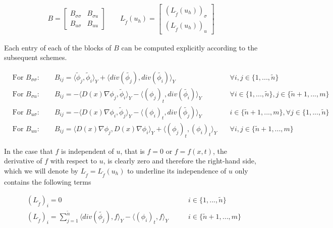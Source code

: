 \documentclass[../draft_1.tex]{subfiles}
\begin{document}
\begin{ceqn}
	\begin{align}
B = \begin{bmatrix}
B_{\sigma \sigma} & B_{\sigma u} \\
B_{u \sigma}  & B_{uu} 
\end{bmatrix}
\qquad
 L_{\tilde{f}}(u_h) = \begin{bmatrix}
(L_{\tilde{f}}(u_h))_{\sigma} \\
(L_{\tilde{f}}(u_h))_u
 \end{bmatrix}
	\end{align}
\end{ceqn}
Each entry of each of the blocks of $B$ can be computed explicitly according to the subsequent schemes.
\begin{ceqn}
	\begin{align}
&\text{For } B_{\sigma \sigma} :	\qquad B_{ij} = \langle \tilde{\phi}_j, \tilde{\phi}_i \rangle_Y + \langle div(\tilde{\phi_j}), div(\tilde{\phi_i}) \rangle_Y \quad &\forall i,j \in \{1, ..., \tilde{n}\} \\
&\text{For } B_{\sigma u} : \qquad B_{ij} = - \langle D(x) \nabla \phi_j, \tilde{\phi}_i \rangle_Y - \langle (\phi_j)_t, div(\tilde{\phi_i}) \rangle_Y \quad &\forall i \in \{1, ..., \tilde{n}\}, j \in \{\tilde{n}+1, ..., m\} \\
&\text{For } B_{u \sigma} : \qquad B_{ij} = - \langle D(x) \nabla \phi_i, \tilde{\phi}_j \rangle_Y - \langle (\phi_i)_t, div(\tilde{\phi_j}) \rangle_Y \quad &i \in \{\tilde{n}+1, ..., m\}, \forall j \in \{1, ..., \tilde{n}\}\\
&\text{For } B_{uu} : \qquad B_{ij} = \langle D(x) \nabla \phi_j, D(x) \nabla \phi_i \rangle_Y + \langle (\phi_j)_t, (\phi_i)_t \rangle_Y \quad &\forall i,j \in \{\tilde{n}+1, ..., m\}
\end{align}
\end{ceqn}
In the case that $f$ is independent of $u$, that is $f = 0$ or $f = f(x,t)$, the derivative of $f$ with respect to $u$, is clearly zero and therefore the right-hand side, which we will denote by $L_{\tilde{f}} = L_{\tilde{f}}(u_h)$ to underline its independence of $u$ only contains the following terms
\begin{ceqn}
	\begin{align}
&(L_{\tilde{f}})_i = 0 \qquad &i \in \{1, ..., \tilde{n} \} \\
&(L_{\tilde{f}})_i = \sum_{j=1}^{\tilde{n}}\langle div(\tilde{\phi_j}), f \rangle_Y - \langle (\phi_i)_t, f \rangle_Y \qquad  &i \in \{\tilde{n}+1, ..., m\}
\end{align}
\end{ceqn}
\end{document}
